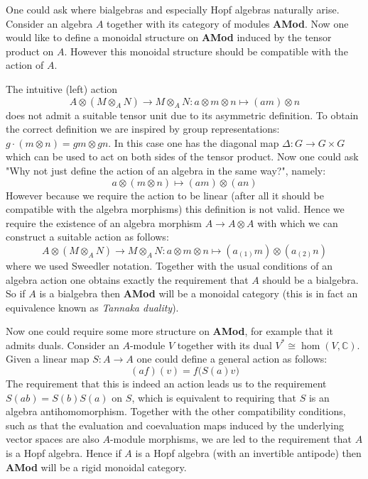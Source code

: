 	\begin{remark}
		One could ask where bialgebras and especially Hopf algebras naturally arise. Consider an algebra $A$ together with its category of modules \textbf{AMod}. Now one would like to define a monoidal structure on \textbf{AMod} induced by the tensor product on $A$. However this monoidal structure should be compatible with the action of $A$.
		
		The intuitive (left) action \[A\otimes(M\otimes_A N)\rightarrow M\otimes_AN: a\otimes m\otimes n\mapsto (am)\otimes n\] does not admit a suitable tensor unit due to its asymmetric definition. To obtain the correct definition we are inspired by group representations: $g\cdot(m\otimes n) = gm\otimes gn$. In this case one has the diagonal map $\Delta:G\rightarrow G\times G$ which can be used to act on both sides of the tensor product. Now one could ask "Why not just define the action of an algebra in the same way?", namely:
		\[a\otimes (m\otimes n)\mapsto (am)\otimes(an)\]
		However because we require the action to be linear (after all it should be compatible with the algebra morphisms) this definition is not valid. Hence we require the existence of an algebra morphism $A\rightarrow A\otimes A$ with which we can construct a suitable action as follows:
		\begin{equation}
			A\otimes(M\otimes_AN)\rightarrow M\otimes_AN:a\otimes m\otimes n\mapsto (a_{(1)}m)\otimes(a_{(2)}n)
		\end{equation}
		where we used Sweedler notation. Together with the usual conditions of an algebra action one obtains exactly the requirement that $A$ should be a bialgebra. So if $A$ is a bialgebra then \textbf{AMod} will be a monoidal category (this is in fact an equivalence known as \textit{Tannaka duality}).
		
		Now one could require some more structure on \textbf{AMod}, for example that it admits duals. Consider an $A$-module $V$ together with its dual $V^*\cong\hom(V, \mathbb{C})$. Given a linear map $S:A\rightarrow A$ one could define a general action as follows:
		\begin{equation}
			(af)(v) = f\big(S(a)v\big)
		\end{equation}
		The requirement that this is indeed an action leads us to the requirement $S(ab) = S(b)S(a)$ on $S$, which is equivalent to requiring that $S$ is an algebra antihomomorphism. Together with the other compatibility conditions, such as that the evaluation and coevaluation maps induced by the underlying vector spaces are also $A$-module morphisms, we are led to the requirement that $A$ is a Hopf algebra. Hence if $A$ is a Hopf algebra (with an invertible antipode) then \textbf{AMod} will be a rigid monoidal category.
	\end{remark}
	
